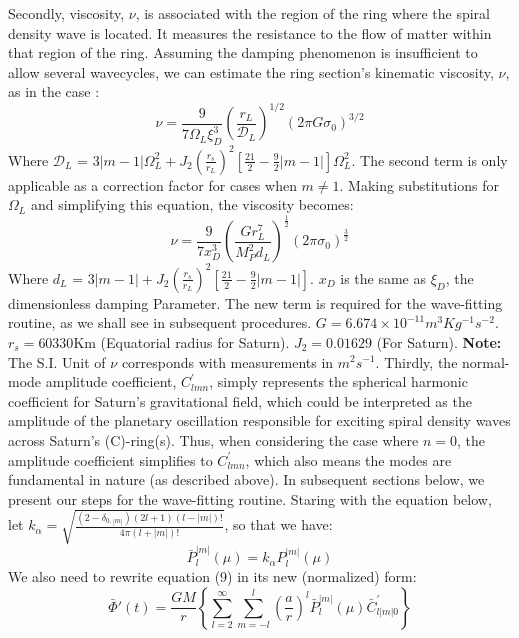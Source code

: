 \documentclass[conference]{IEEEtran}
\begin{document}
Secondly, viscosity, $\nu$, is associated with the region of the ring where the spiral density wave is located. It measures the resistance to the flow of matter within that region of the ring. Assuming the damping phenomenon is insufficient to allow several wavecycles, we can estimate the ring section's kinematic viscosity, $\nu$, as in the case \cite{GOLDREICH1978240}\cite{1984prin.conf..513S}\cite{Tiscareno_2007}:
\begin{equation}
\nu = \frac{9}{7\Omega_{L}\xi_{D}^{3}}\left(\frac{r_{L}}{\mathcal{D}_{L}}\right)^{1/2}(2\pi G \sigma_{0})^{3/2}
\end{equation}
Where $\mathcal{D}_{L}$ = $3|m-1|\Omega_{L}^{2} + J_{2}(\frac{r_{s}}{r_{L}})^{2}[\frac{21}{2}-\frac{9}{2}|m-1|]\Omega_{L}^{2}$. The second term is only applicable as a correction factor for cases when $m \neq 1$.
Making substitutions for $\Omega_{L}$ and simplifying this equation, the viscosity becomes:
\begin{equation}
\nu = \frac{9}{7 x_{D}^{3}}(\frac{Gr_{L}^{7}}{M_{P}^{2}d_{L}})^{\frac{1}{2}}(2\pi\sigma_{0})^{\frac{3}{2}}
\end{equation}
Where $d_{L}$ = $3|m-1| + J_{2}(\frac{r_{s}}{r_{L}})^{2}[\frac{21}{2}-\frac{9}{2}|m-1|]$. $x_{D}$ is the same as $\xi_{D}$, the dimensionless damping Parameter. The new term is required for the wave-fitting routine, as we shall see in subsequent procedures. $G = 6.674 \times 10^{-11}m^{3} Kg^{-1} s^{-2}$. $r_{s} = 60330$Km (Equatorial radius for Saturn). $J_{2} = 0.01629$ (For Saturn). \textbf{Note:} The S.I. Unit of $\nu$ corresponds with measurements in $m^{2}s^{-1}$.
Thirdly, the normal-mode amplitude coefficient, $C^{'}_{lmn}$, simply represents the spherical harmonic coefficient for Saturn's gravitational field, which could be interpreted as the amplitude of the planetary oscillation responsible for exciting spiral density waves across Saturn's (C)-ring(s). Thus, when considering the case where $n=0$, the amplitude coefficient simplifies to $C^{'}_{lmn}$, which also means the modes are fundamental in nature (as described above). In subsequent sections below, we present our steps for the wave-fitting routine. Staring with the equation below, let $k_{\alpha} = \sqrt{\frac{{(2-\delta_{0,|m|})(2l+1)(l-|m|)!}}{{4\pi (l+|m|)!}}}$, so that we have:
\begin{equation}
\bar{P}_{l}^{|m|} (\mu) = k_{\alpha} P^{|m|}_{l} (\mu)
\end{equation}
We also need to rewrite equation (9) in its new (normalized) form:
\begin{equation}
\bar{\Phi}{'}(t) = \frac{GM}{r}\left\{\sum_{l=2}^{\infty}\sum_{m=-l}^{l}\left(\frac{a}{r}\right)^{l}\bar{P}_{l}^{|m|}(\mu)\bar{C}_{l|m|0}^{'}\right\}
\end{equation}
\end{document}
